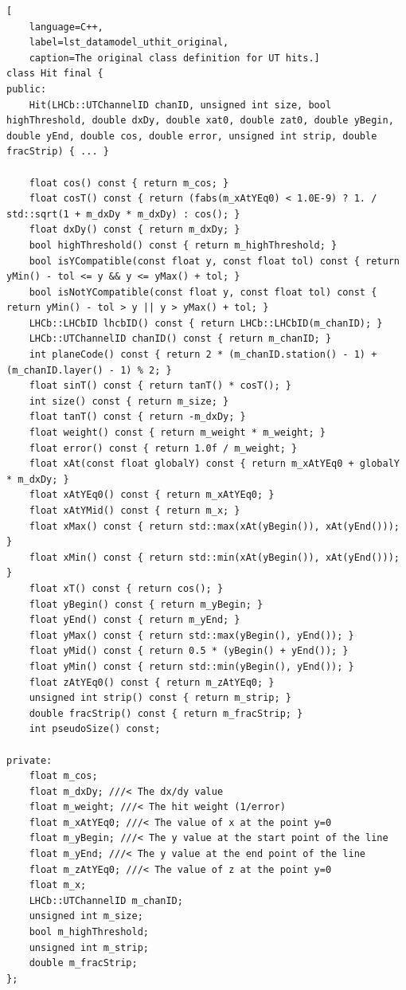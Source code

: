 \documentclass[12pt]{article}
\begin{document}
\begin{lstlisting}[
	language=C++,
	label=lst_datamodel_uthit_original,
	caption=The original class definition for UT hits.]
class Hit final {
public:
	Hit(LHCb::UTChannelID chanID, unsigned int size, bool highThreshold, double dxDy, double xat0, double zat0, double yBegin, double yEnd, double cos, double error, unsigned int strip, double fracStrip) { ... }

	float cos() const { return m_cos; }
	float cosT() const { return (fabs(m_xAtYEq0) < 1.0E-9) ? 1. / std::sqrt(1 + m_dxDy * m_dxDy) : cos(); }
	float dxDy() const { return m_dxDy; }
	bool highThreshold() const { return m_highThreshold; }
	bool isYCompatible(const float y, const float tol) const { return yMin() - tol <= y && y <= yMax() + tol; }
	bool isNotYCompatible(const float y, const float tol) const { return yMin() - tol > y || y > yMax() + tol; }
	LHCb::LHCbID lhcbID() const { return LHCb::LHCbID(m_chanID); }
	LHCb::UTChannelID chanID() const { return m_chanID; }
	int planeCode() const { return 2 * (m_chanID.station() - 1) + (m_chanID.layer() - 1) % 2; }
	float sinT() const { return tanT() * cosT(); }
	int size() const { return m_size; }
	float tanT() const { return -m_dxDy; }
	float weight() const { return m_weight * m_weight; }
	float error() const { return 1.0f / m_weight; }
	float xAt(const float globalY) const { return m_xAtYEq0 + globalY * m_dxDy; }
	float xAtYEq0() const { return m_xAtYEq0; }
	float xAtYMid() const { return m_x; }
	float xMax() const { return std::max(xAt(yBegin()), xAt(yEnd())); }
	float xMin() const { return std::min(xAt(yBegin()), xAt(yEnd())); }
	float xT() const { return cos(); }
	float yBegin() const { return m_yBegin; }
	float yEnd() const { return m_yEnd; }
	float yMax() const { return std::max(yBegin(), yEnd()); }
	float yMid() const { return 0.5 * (yBegin() + yEnd()); }
	float yMin() const { return std::min(yBegin(), yEnd()); }
	float zAtYEq0() const { return m_zAtYEq0; }
	unsigned int strip() const { return m_strip; }
	double fracStrip() const { return m_fracStrip; }
	int pseudoSize() const;

private:
	float m_cos;
	float m_dxDy; ///< The dx/dy value
	float m_weight; ///< The hit weight (1/error)
	float m_xAtYEq0; ///< The value of x at the point y=0
	float m_yBegin; ///< The y value at the start point of the line
	float m_yEnd; ///< The y value at the end point of the line
	float m_zAtYEq0; ///< The value of z at the point y=0
	float m_x;
	LHCb::UTChannelID m_chanID;
	unsigned int m_size;
	bool m_highThreshold;
	unsigned int m_strip;
	double m_fracStrip;
};
\end{lstlisting}
\end{document}
